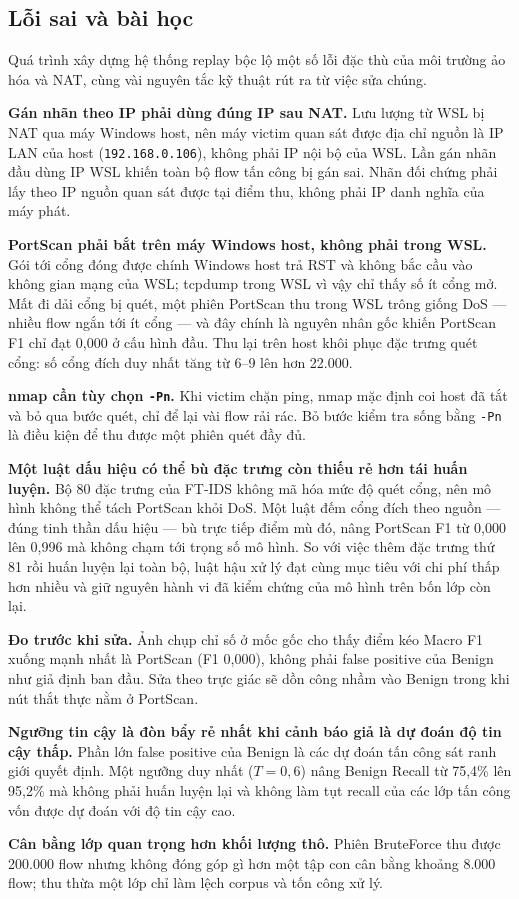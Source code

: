 \documentclass[../DoAn.tex]{subfiles}
\begin{document}
\subsection{Lỗi sai và bài học}
\label{subsec:tn-baihoc}

Quá trình xây dựng hệ thống replay bộc lộ một số lỗi đặc thù của môi trường ảo hóa và NAT, cùng vài nguyên tắc kỹ thuật rút ra từ việc sửa chúng.

\textbf{Gán nhãn theo IP phải dùng đúng IP sau NAT.} Lưu lượng từ WSL bị NAT qua máy Windows host, nên máy victim quan sát được địa chỉ nguồn là IP LAN của host (\texttt{192.168.0.106}), không phải IP nội bộ của WSL. Lần gán nhãn đầu dùng IP WSL khiến toàn bộ flow tấn công bị gán sai. Nhãn đối chứng phải lấy theo IP nguồn quan sát được tại điểm thu, không phải IP danh nghĩa của máy phát.

\textbf{PortScan phải bắt trên máy Windows host, không phải trong WSL.} Gói tới cổng đóng được chính Windows host trả RST và không bắc cầu vào không gian mạng của WSL; tcpdump trong WSL vì vậy chỉ thấy số ít cổng mở. Mất đi dải cổng bị quét, một phiên PortScan thu trong WSL trông giống DoS --- nhiều flow ngắn tới ít cổng --- và đây chính là nguyên nhân gốc khiến PortScan F1 chỉ đạt 0,000 ở cấu hình đầu. Thu lại trên host khôi phục đặc trưng quét cổng: số cổng đích duy nhất tăng từ 6--9 lên hơn 22.000.

\textbf{nmap cần tùy chọn \texttt{-Pn}.} Khi victim chặn ping, nmap mặc định coi host đã tắt và bỏ qua bước quét, chỉ để lại vài flow rải rác. Bỏ bước kiểm tra sống bằng \texttt{-Pn} là điều kiện để thu được một phiên quét đầy đủ.

\textbf{Một luật dấu hiệu có thể bù đặc trưng còn thiếu rẻ hơn tái huấn luyện.} Bộ 80 đặc trưng của FT-IDS không mã hóa mức độ quét cổng, nên mô hình không thể tách PortScan khỏi DoS. Một luật đếm cổng đích theo nguồn --- đúng tinh thần dấu hiệu --- bù trực tiếp điểm mù đó, nâng PortScan F1 từ 0,000 lên 0,996 mà không chạm tới trọng số mô hình. So với việc thêm đặc trưng thứ 81 rồi huấn luyện lại toàn bộ, luật hậu xử lý đạt cùng mục tiêu với chi phí thấp hơn nhiều và giữ nguyên hành vi đã kiểm chứng của mô hình trên bốn lớp còn lại.

\textbf{Đo trước khi sửa.} Ảnh chụp chỉ số ở mốc gốc cho thấy điểm kéo Macro F1 xuống mạnh nhất là PortScan (F1 0,000), không phải false positive của Benign như giả định ban đầu. Sửa theo trực giác sẽ dồn công nhầm vào Benign trong khi nút thắt thực nằm ở PortScan.

\textbf{Ngưỡng tin cậy là đòn bẩy rẻ nhất khi cảnh báo giả là dự đoán độ tin cậy thấp.} Phần lớn false positive của Benign là các dự đoán tấn công sát ranh giới quyết định. Một ngưỡng duy nhất ($T=0{,}6$) nâng Benign Recall từ 75,4\% lên 95,2\% mà không phải huấn luyện lại và không làm tụt recall của các lớp tấn công vốn được dự đoán với độ tin cậy cao.

\textbf{Cân bằng lớp quan trọng hơn khối lượng thô.} Phiên BruteForce thu được 200.000 flow nhưng không đóng góp gì hơn một tập con cân bằng khoảng 8.000 flow; thu thừa một lớp chỉ làm lệch corpus và tốn công xử lý.
\end{document}
